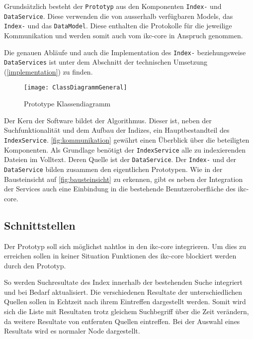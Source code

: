 Grundsätzlich besteht der \texttt{Prototyp} aus den Komponenten \texttt{Index-} und \texttt{DataService}. Diese verwenden die von ausserhalb ver\-füg\-bar\-en Models, das \texttt{In\-dex-} und das \texttt{DataModel}. Diese enthalten die Protokolle für die jeweilige Kommunikation und werden somit auch vom \gls{ikc-core} in Anspruch genommen.

Die genauen Abläufe und auch die Implementation des \texttt{Index-} beziehungsweise \texttt{DataServices} ist unter dem Abschnitt der technischen Umsetzung (\autoref{implementation}) zu finden.

    \begin{figure}[H]
    \centering
    \texttt{[image: ClassDiagrammGeneral]}
    \caption{Prototype Klassendiagramm}
    \label{fig:prototypeClassDiagram-easy}
    \end{figure}

Der Kern der Software bildet der Algorithmus. Dieser ist, neben der Suchfunktionalität und dem Aufbau der Indizes, ein Hauptbestandteil des \texttt{IndexService}. \autoref{fig:kommunikation} gewährt einen Überblick über die beteiligten Komponenten. Als Grundlage benötigt der \texttt{In\-dex\-Ser\-vice} alle zu indexierenden Dateien im Volltext. Deren Quelle ist der \texttt{Data\-Ser\-vice}. Der \texttt{Index-} und der \texttt{DataService} bilden zusammen den eigentlichen Prototypen. Wie in der Bausteinsicht auf \autoref{fig:bausteinsicht} zu erkennen, gibt es neben der Integration der Services auch eine Einbindung in die bestehende Benutzeroberfläche des \gls{ikc-core}.


\subsection{Schnittstellen}


Der Prototyp soll sich möglichst nahtlos in den \gls{ikc-core} integrieren. Um dies zu erreichen sollen in keiner Situation Funktionen des \gls{ikc-core} blockiert werden durch den Prototyp. 

So werden Suchresultate des Index innerhalb der bestehenden Suche integriert und bei Bedarf aktualisiert. Die verschiedenen Resultate der unterschiedlichen Quellen sollen in Echtzeit nach ihrem Eintreffen dargestellt werden. Somit wird sich die Liste mit Resultaten trotz gleichem Suchbegriff über die Zeit verändern, da weitere Resultate von entfernten Quellen eintreffen. Bei der Auswahl eines Resultats wird es normaler Node dargestellt. 

